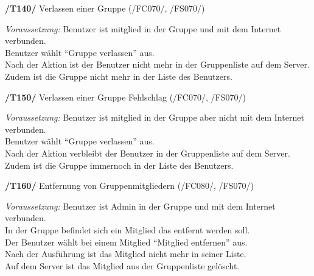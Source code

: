 \textbf{/T140/} Verlassen einer Gruppe (/FC070/, /FS070/)\\
\begin{center}
\vspace{-\parskip}
\begin{minipage}[t]{0.9\textwidth}
\emph{Voraussetzung:} Benutzer ist mitglied in der Gruppe und mit dem Internet verbunden.\\
Benutzer wählt "`Gruppe verlassen"' aus.\\
Nach der Aktion ist der Benutzer nicht mehr in der Gruppenliste auf dem Server.\\
Zudem ist die Gruppe nicht mehr in der Liste des Benutzers.\\
\end{minipage}
\end{center}

\textbf{/T150/} Verlassen einer Gruppe Fehlschlag (/FC070/, /FS070/)\\
\begin{center}
\vspace{-\parskip}
\begin{minipage}[t]{0.9\textwidth}
\emph{Voraussetzung:} Benutzer ist mitglied in der Gruppe aber nicht mit dem Internet verbunden.\\
Benutzer wählt "`Gruppe verlassen"' aus.\\
Nach der Aktion verbleibt der Benutzer in der Gruppenliste auf dem Server.\\
Zudem ist die Gruppe immernoch in der Liste des Benutzers.\\
\end{minipage}
\end{center}

\textbf{/T160/} Entfernung von Gruppenmitgliedern (/FC080/, /FS070/)\\
\begin{center}
\vspace{-\parskip}
\begin{minipage}[t]{0.9\textwidth}
\emph{Voraussetzung:} Benutzer ist Admin in der Gruppe und mit dem Internet verbunden.\\
In der Gruppe befindet sich ein Mitglied das entfernt werden soll.              \\
Der Benutzer wählt bei einem Mitglied "`Mitglied entfernen"' aus.                  \\
Nach der Ausführung ist das Mitglied nicht mehr in seiner Liste.                 \\
Auf dem Server ist das Mitglied aus der Gruppenliste gelöscht.                    \\
\end{minipage}
\end{center}

